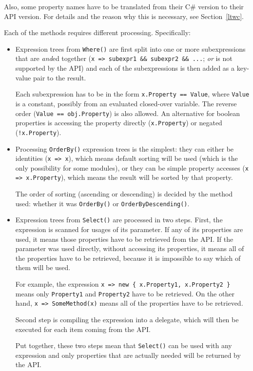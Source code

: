 Also, some property names have to be translated from their C\# version to their API version.
For details and the reason why this is necessary, see Section~\ref{ltwc}.

\medskip

Each of the methods requires different processing. Specifically:

\begin{itemize}
\item Expression trees from \lstinline{Where()} are first split into one or more subexpressions
that are \emph{and}ed together (\lstinline{x => subexpr1 && subexpr2 && ...}; \emph{or} is not supported by the API)
and each of the subexpressions is then added as a key-value pair to the result.

Each subexpression has to be in the form \lstinline{x.Property == Value},
where \lstinline{Value} is a constant, possibly from an evaluated closed-over variable.
The reverse order (\lstinline{Value == obj.Property}) is also allowed.
An alternative for boolean properties is accessing the property directly (\lstinline{x.Property})
or negated (\lstinline{!x.Property}).

\item Processing \lstinline{OrderBy()} expression trees is the simplest:
they can either be identities (\lstinline{x => x}), which means default sorting will be used
(which is the only possibility for some modules),
or they can be simple property accesses (\lstinline{x => x.Property}),
which means the result will be sorted by that property.

The order of sorting (ascending or descending) is decided by the method used:
whether it was \lstinline{OrderBy()} or \lstinline{OrderByDescending()}.

\item Expression trees from \lstinline{Select()} are processed in two steps.
First, the expression is scanned for usages of its parameter.
If any of its properties are used, it means those properties have to be retrieved from the API.
If the parameter was used directly, without accessing its properties,
it means all of the properties have to be retrieved, because it is impossible to say which of them will be used.

For example, the expression \lstinline|x => new { x.Property1, x.Property2 }|
means only \lstinline{Property1} and \lstinline{Property2} have to be retrieved.
On the other hand, \lstinline{x => SomeMethod(x)} means all of the properties have to be retrieved.

Second step is compiling the expression into a delegate,
which will then be executed for each item coming from the API.

Put together, these two steps mean that \lstinline{Select()} can be used with any expression
and only properties that are actually needed will be returned by the API.
\end{itemize}

